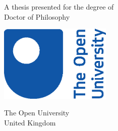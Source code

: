 \begin{titlepage}
    \begin{center}
        \vspace*{1cm}
            
        \Huge
        \textbf{\thetitle}
            
        \vspace{0.5cm}
        \LARGE
            
        \vspace{1.5cm}
            
        \textbf{\theauthor}
            
        \vfill
            
        A thesis presented for the degree of\\
        Doctor of Philosophy
            
        \vspace{0.8cm}
            
        \includegraphics[width=0.4\textwidth]{images/OU-logo-2017.eps}
        \vspace{1.6cm}
        
        \centering
        \usebox{\largestimage}
        \hfill
        
        
        \vspace{0.8cm}
            
        \Large
        The Open University\\
        United Kingdom\\
        \thedate
            
    \end{center}
\end{titlepage}